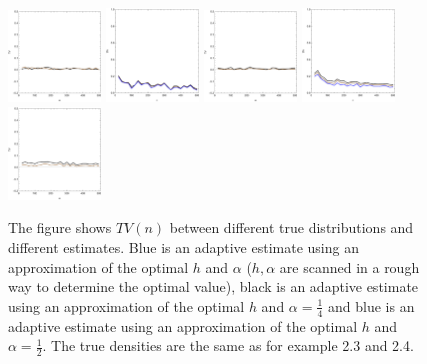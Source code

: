 \documentclass[
twoside,
openright,
titlepage,
numbers=noenddot,
headinclude,%
footinclude=true,
dottedtoc, %
ngerman,
american, %
pagesize=pdftex,
]{book}
\begin{document}
\begin{example}
\begin{figure}[H]
			\includegraphics[width=0.22\textwidth]{figures/1DTVexamples/sn2}
			\includegraphics[width=0.22\textwidth]{figures/1DTVexamples/n+l1}
			\includegraphics[width=0.22\textwidth]{figures/1DTVexamples/n+l2}
			\includegraphics[width=0.22\textwidth]{figures/1DTVexamples/sn+t1}
			\includegraphics[width=0.22\textwidth]{figures/1DTVexamples/sn+t2}
			\caption{The figure shows $TV(n)$ between different true distributions and different estimates. Blue is an adaptive estimate using an approximation of the optimal $h$ and $\alpha$ ($h,\alpha$ are scanned in a rough way to determine the optimal value), black is an adaptive estimate using an approximation of the optimal $h$ and $\alpha=\frac{1}{4}$ and blue is an adaptive estimate using an approximation of the optimal $h$ and $\alpha=\frac{1}{2}$. The true densities are the same as for example 2.3 and 2.4.}
			\label{fig:6}
		\end{figure}

\end{example}
\end{document}
